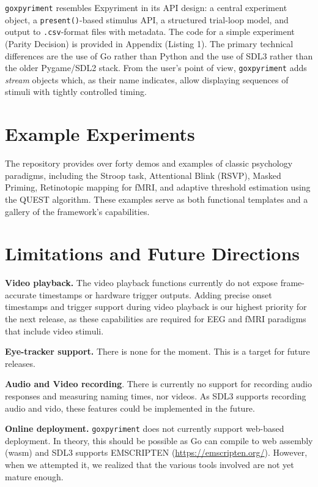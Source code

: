 \documentclass[man,a4paper]{apa7}
\begin{document}
\texttt{goxpyriment} resembles Expyriment in its API design: a central
experiment object, a \texttt{present()}-based stimulus API, a
structured trial-loop model, and output to \texttt{.csv}-format files
with metadata. The code for a simple experiment (Parity Decision) is
provided in Appendix (Listing 1). The primary technical differences
are the use of Go rather than Python and the use of SDL3 rather than
the older Pygame/SDL2 stack. From the user's point of view,
\texttt{goxpyriment} adds \emph{stream} objects which, as their name
indicates, allow displaying sequences of stimuli with tightly
controlled timing.


\section{Example Experiments}\label{example-experiments}

The repository provides over forty demos and examples of classic
psychology paradigms, including the Stroop task, Attentional Blink
(RSVP), Masked Priming, Retinotopic mapping for fMRI, and adaptive
threshold estimation using the QUEST algorithm. These examples serve
as both functional templates and a gallery of the framework's
capabilities.


\section{Limitations and Future Directions}\label{limitations-and-future-directions}

\textbf{Video playback.} The video playback functions currently
do not expose frame-accurate timestamps or hardware trigger
outputs. Adding precise onset timestamps and trigger support during video
playback is our highest priority for the next release, as these
capabilities are required for EEG and fMRI paradigms that include
video stimuli.

\textbf{Eye-tracker support.} There is none for the moment. This is
a target for future releases.

\textbf{Audio and Video recording}. There is currently no support for recording
audio responses and measuring naming times, nor videos. As SDL3 supports recording
audio and vido, these features could be implemented in the future.

\textbf{Online deployment.} \texttt{goxpyriment} does not currently
support web-based deployment. In theory, this should be possible as Go
can compile to web assembly (wasm) and SDL3 supports EMSCRIPTEN
(\url{https://emscripten.org/}). However, when we attempted it, we realized that
the various tools involved are not yet mature enough.
\end{document}

